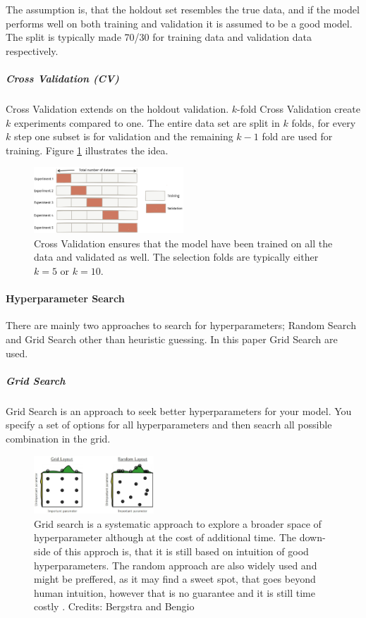The assumption is, that the holdout set resembles the true data, and if the model performs well on both training and validation it is assumed to be a good model. The split is typically made 70/30 for training data and validation data respectively. 

\subparagraph{Cross Validation (CV)}

Cross Validation extends on the holdout validation. $k$-fold Cross Validation create $k$ experiments compared to one. The entire data set are split in $k$ folds, for every $k$ step one subset is for validation and the remaining $k-1$ fold are used for training. Figure \ref{fig:cv} illustrates the idea. 

\begin{figure}[H]
    \centering
    \includegraphics[width=0.5\textwidth]{figures/cv.png}
    \caption[]{Cross Validation ensures that the model have been trained on all the data and validated as well. The selection folds are typically either $k=5$ or $k=10$. }
    \label{fig:cv}
\end{figure}

\paragraph{Hyperparameter Search}

There are mainly two approaches to search for hyperparameters; Random Search and Grid Search other than heuristic guessing. In this paper Grid Search are used.

\subparagraph{Grid Search}

Grid Search is an approach to seek better hyperparameters for your model. You specify a set of options for all hyperparameters and then seacrh all possible combination in the grid. 

\begin{figure}[H]
    \centering
    \includegraphics[width=0.4\textwidth]{figures/gridsearch_vs_randomsearch.jpeg}
    \caption[]{Grid search is a systematic approach to explore a broader space of hyperparameter although at the cost of additional time. The down-side of this approch is, that it is still based on intuition of good hyperparameters. The random approach are also widely used and might be preffered, as it may find a sweet spot, that goes beyond human intuition, however that is no guarantee and it is still time costly \cite{Bergstra}. Credits: Bergstra and Bengio}
    \label{fig:gs_vs_rs}
\end{figure}

  